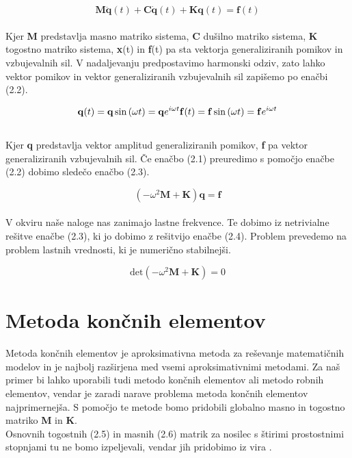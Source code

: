 \documentclass[12pt]{report}
\begin{document}
\begin{equation}
  \mathbf{M} \mathbf{\ddot{q}}(t) + \mathbf{C} \mathbf{\dot{q}}(t) + \mathbf{K} \mathbf{q}(t) = \mathbf{f}(t)
\end{equation}
\\
Kjer \textbf{M} predstavlja masno matriko sistema, \textbf{C} dušilno matriko sistema, \textbf{K} togostno matriko sistema, \textbf{x}(t) in \textbf{f}(t)
pa sta vektorja generaliziranih pomikov in vzbujevalnih sil.
V nadaljevanju predpostavimo harmonski odziv, zato lahko vektor pomikov in vektor generaliziranih vzbujevalnih sil zapišemo po enačbi (2.2).

\begin{equation}
  \mathbf{q}(t)=\mathbf{q} \sin{(\omega t)} =\mathbf{q}e^{i\omega t} \\
  \mathbf{f}(t)=\mathbf{f} \sin{(\omega t)} =\mathbf{f}e^{i\omega t}
\end{equation}
\\
Kjer \textbf{q} predstavlja vektor amplitud generaliziranih pomikov, \textbf{f} pa vektor generaliziranih vzbujevalnih sil. Če enačbo (2.1) preuredimo s pomočjo enačbe (2.2) dobimo sledečo enačbo
(2.3).

\begin{equation}
  (-\omega^2 \mathbf{M} + \mathbf{K}) \mathbf{q} = \mathbf{f}
\end{equation}
\\
V okviru naše naloge nas zanimajo lastne frekvence. Te dobimo iz netrivialne rešitve enačbe (2.3), ki jo dobimo z rešitvijo enačbe (2.4).
Problem prevedemo na problem lastnih vrednosti, ki je numerično stabilnejši.

\begin{equation}
  \textrm{det} (-\omega^2 \mathbf{M} + \mathbf{K})=0  
\end{equation}

\section{Metoda končnih elementov}
Metoda končnih elementov je aproksimativna metoda za reševanje matematičnih modelov in je najbolj razširjena med vsemi aproksimativnimi metodami.
Za naš primer bi lahko uporabili tudi metodo končnih elementov ali metodo robnih elementov, vendar je zaradi narave problema metoda končnih elementov najprimernejša.
S pomočjo te metode bomo pridobili globalno masno in togostno matriko \textbf{M} in \textbf{K}. 
\\
Osnovnih togostnih (2.5) in masnih (2.6) matrik za nosilec s štirimi prostostnimi stopnjami tu ne bomo izpeljevali, vendar jih pridobimo iz vira \cite{ville}.
\end{document}
